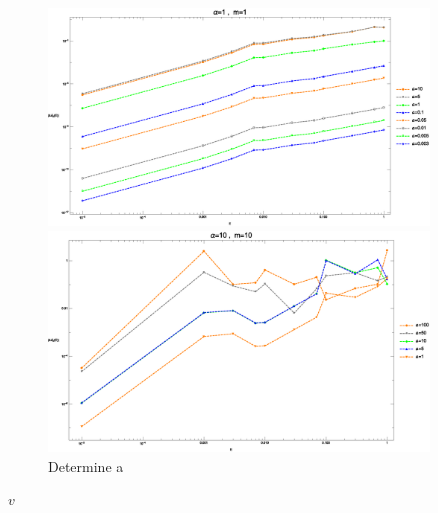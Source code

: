 \documentclass[hyperref]{ctexart}
\begin{document}
\begin{figure}[!htbp]
\begin{minipage}[t]{0.5\linewidth}
  \centering
  \includegraphics[width=0.9\textwidth]{Test_Coulomb_6_Various_a.eps}
\end{minipage}
\begin{minipage}[t]{0.5\linewidth}
  \centering
  \includegraphics[width=0.9\textwidth]{Test_Coulomb_6_Various_a_1.eps}
\end{minipage}
\caption{Determine a}
\end{figure}
$v$
\end{document}
